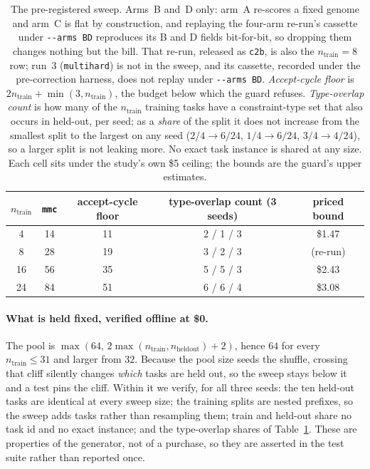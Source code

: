 \documentclass[11pt]{article}
\begin{document}
\begin{table}[h]
\centering
\begin{tabular}{ccccc}
\toprule
$n_{\mathrm{train}}$ & \texttt{mmc} & accept-cycle floor & type-overlap count (3 seeds) & priced bound \\
\midrule
4  & 14 & 11 & 2 / 1 / 3 & \$1.47 \\
8  & 28 & 19 & 3 / 2 / 3 & (re-run) \\
16 & 56 & 35 & 5 / 5 / 3 & \$2.43 \\
24 & 84 & 51 & 6 / 6 / 4 & \$3.08 \\
\bottomrule
\end{tabular}
\caption{The pre-registered sweep. Arms~B and~D only: arm~A re-scores a fixed genome and
arm~C is flat by construction, and replaying the four-arm re-run's cassette under
\texttt{-{}-arms BD} reproduces its B and D fields bit-for-bit, so dropping them changes nothing
but the bill. That re-run, released as \texttt{c2b}, is also the $n_{\mathrm{train}}{=}8$ row;
run~3 (\texttt{multihard}) is not in the sweep, and its cassette, recorded under the
pre-correction harness, does not replay under \texttt{-{}-arms BD}.
\emph{Accept-cycle floor} is $2n_{\mathrm{train}} + \min(3, n_{\mathrm{train}})$, the budget
below which the guard refuses. \emph{Type-overlap count} is how many of the
$n_{\mathrm{train}}$ training tasks have a constraint-type set that also occurs in held-out,
per seed; as a \emph{share} of the split it does not increase from the smallest split to the
largest on any seed ($2/4 \to 6/24$, $1/4 \to 6/24$, $3/4 \to 4/24$), so a larger split is not
leaking more. No exact task instance is shared at any size. Each cell
sits under the study's own \$5 ceiling; the bounds are the guard's upper estimates.}
\label{tab:splitsweep}
\end{table}

\paragraph{What is held fixed, verified offline at \$0.} The pool is
$\max(64,\,2\max(n_{\mathrm{train}}, n_{\mathrm{heldout}}) + 2)$, hence $64$ for every
$n_{\mathrm{train}} \le 31$ and larger from $32$. Because the pool size seeds the shuffle,
crossing that cliff silently changes \emph{which} tasks are held out, so the sweep stays below
it and a test pins the cliff. Within it we verify, for all three seeds: the ten held-out tasks
are identical at every sweep size; the training splits are nested prefixes, so the sweep adds
tasks rather than resampling them; train and held-out share no task id and no exact instance;
and the type-overlap shares of Table~\ref{tab:splitsweep}. These are properties of the
generator, not of a purchase, so they are asserted in the test suite rather than reported once.
\end{document}
